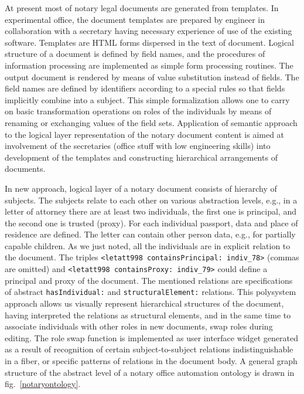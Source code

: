 \documentclass[conference]{IEEEtran}
\begin{document}
At present most of notary legal documents are generated from
templates.  In experimental office, the document templates are
prepared by engineer in collaboration with a secretary having
necessary experience of use of the existing software.  Templates are
HTML forms dispersed in the text of document.  Logical structure of a
document is defined by field names, and the procedures of information
processing are implemented as simple form processing routines.  The
output document is rendered by means of value substitution instead of
fields.  The field names are defined by identifiers according to a
special rules so that fields implicitly combine into a subject.
This simple formalization allows one to carry on basic transformation
operations on roles of the individuals by means of renaming or
exchanging values of the field sets.  Application of semantic
approach to the logical layer representation of the notary document
content is aimed at involvement of the secretaries (office stuff with
low engineering skills) into development of the templates and
constructing hierarchical arrangements of documents.

In new approach, logical layer of a notary document consists of
hierarchy of subjects.  The subjects relate to each other on various
abstraction levels, e.g., in a letter of attorney there are at least
two individuals, the first one is principal, and the second one is
trusted (proxy).  For each individual passport, data and place of
residence are defined.  The letter can contain other person data,
e.g., for partially capable children.  As we just noted, all the
individuals are in explicit relation to the document.  The triples
\texttt{<letatt998 containsPrincipal: indiv\_78>} (commas are omitted)
and \texttt{<letatt998 containsProxy: indiv\_79>} could define a
principal and proxy of the document.  The mentioned relations are
specifications of abstract \texttt{hasIndividual:} and
\texttt{structuralElement:} relations.  This polysystem approach
allows us visually represent hierarchical structures of the document,
having interpreted the relations as structural elements, and in the
same time to associate individuals with other roles in new documents,
swap roles during editing.  The role swap function is implemented as
user interface widget generated as a result of recognition of certain
subject-to-subject relations indistinguishable in a fiber, or specific
patterns of relations in the document body.  A general graph structure
of the abstract level of a notary office automation ontology is drawn
in fig.~\ref{notaryontology}.
\end{document}
